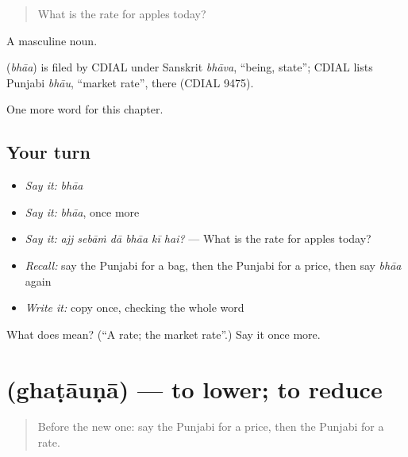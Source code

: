 \begin{quote}
What is the rate for apples today?
\end{quote}

A masculine noun.

\begin{cousinweb}
\textbf{} (\emph{bhāa}) is filed by CDIAL under Sanskrit \emph{bhāva}, \textquotedblleft{}being, state\textquotedblright{}; CDIAL lists Punjabi \emph{bhāu}, \textquotedblleft{}market rate\textquotedblright{}, there (CDIAL 9475).
\end{cousinweb}

\begin{grammarlens}[title={What you've built}]
One more word for this chapter.
\end{grammarlens}

\subsection*{Your turn}
\begin{itemize}
\raggedright
  \item \emph{Say it:} \emph{bhāa}
  \item \emph{Say it:} \emph{bhāa}, once more
  \item \emph{Say it:} \emph{ajj sebāṁ dā bhāa kī hai?} — What is the rate for apples today?
  \item \emph{Recall:} say the Punjabi for a bag, then the Punjabi for a price, then say \emph{bhāa} again
  \item \emph{Write it:} copy \textbf{} once, checking the whole word
\end{itemize}

\begin{tcolorbox}[breakable,colback=teal!4,colframe=teal!35!black,title={Before you move on}]
What does  mean? (\textquotedblleft{}A rate; the market rate\textquotedblright{}.) Say it once more.
\end{tcolorbox}
\section[\texorpdfstring{\pa{ਘਟਾਉਣਾ} (ghaṭāuṇā)}{ਘਟਾਉਣਾ (ghaṭāuṇā)}]{ (ghaṭāuṇā) — to lower; to reduce}

\label{lesson:PA-C276-ghatauna}



\begin{quote}
Before the new one: say the Punjabi for a price, then the Punjabi for a rate.
\end{quote}

